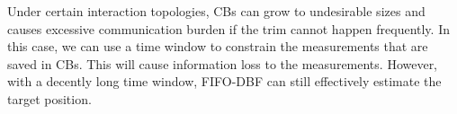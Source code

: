 	\begin{rem}
		Under certain interaction topologies, CBs can grow to undesirable sizes and causes excessive communication burden if the trim cannot happen frequently.
		In this case, we can use a time window to constrain the measurements that are saved in CBs.
		This will cause information loss to the measurements.
		However, with a decently long time window, FIFO-DBF can still effectively estimate the target position.
	\end{rem}